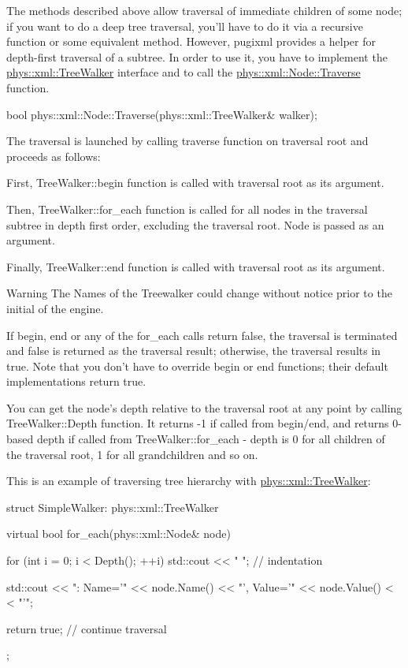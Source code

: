 The methods described above allow traversal of immediate children of some node; if you want to do a deep tree traversal, you'll have to do it via a recursive function or some equivalent method. However, pugixml provides a helper for depth-\/first traversal of a subtree. In order to use it, you have to implement the \hyperlink{classphys_1_1xml_1_1TreeWalker}{phys::xml::TreeWalker} interface and to call the \hyperlink{classphys_1_1xml_1_1Node_a0029d08d3689c36d882ada0c0c9cf6e9}{phys::xml::Node::Traverse} function. 
\begin{DoxyCode}
 bool phys::xml::Node::Traverse(phys::xml::TreeWalker& walker);
\end{DoxyCode}
 The traversal is launched by calling traverse function on traversal root and proceeds as follows:
\begin{DoxyItemize}
\item First, TreeWalker::begin function is called with traversal root as its argument.
\item Then, TreeWalker::for\_\-each function is called for all nodes in the traversal subtree in depth first order, excluding the traversal root. Node is passed as an argument.
\item Finally, TreeWalker::end function is called with traversal root as its argument.
\end{DoxyItemize}

\begin{DoxyWarning}{Warning}
The Names of the Treewalker could change without notice prior to the initial of the engine.
\end{DoxyWarning}
If begin, end or any of the for\_\-each calls return false, the traversal is terminated and false is returned as the traversal result; otherwise, the traversal results in true. Note that you don't have to override begin or end functions; their default implementations return true. \par
 \par
 You can get the node's depth relative to the traversal root at any point by calling TreeWalker::Depth function. It returns -\/1 if called from begin/end, and returns 0-\/based depth if called from TreeWalker::for\_\-each -\/ depth is 0 for all children of the traversal root, 1 for all grandchildren and so on. \par
 \par
 This is an example of traversing tree hierarchy with \hyperlink{classphys_1_1xml_1_1TreeWalker}{phys::xml::TreeWalker}: 
\begin{DoxyCode}
 struct SimpleWalker: phys::xml::TreeWalker
 {
     virtual bool for_each(phys::xml::Node& node)
     {
         for (int i = 0; i < Depth(); ++i) std::cout << "  "; // indentation

         std::cout << ": Name='" << node.Name() << "', Value='" << node.Value() <
      < "'\n";

         return true; // continue traversal
     }
 };
\end{DoxyCode}
 

